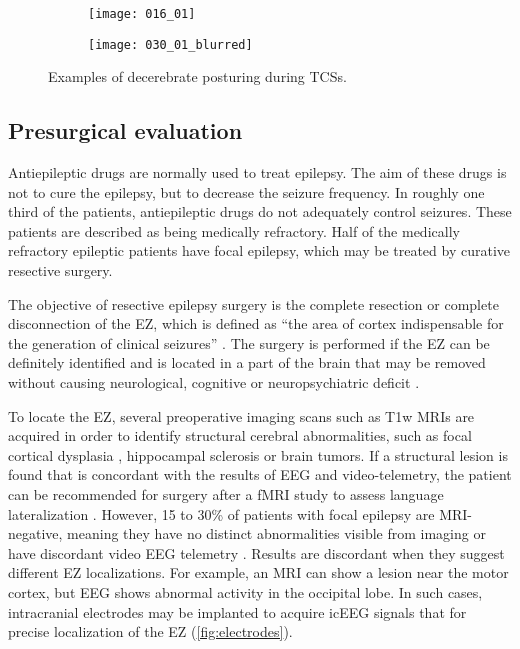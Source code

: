\begin{figure}
  \centering

  \begin{subfigure}{0.49\linewidth}
    \texttt{[image: 016\_01]}
  \end{subfigure}
  \begin{subfigure}{0.49\linewidth}
    \texttt{[image: 030\_01\_blurred]}
  \end{subfigure}
  \caption[Examples of decerebrate posturing]{
    Examples of decerebrate posturing during \acp{TCS}.
  }
  \label{fig:decerebration}
\end{figure}


\subsection{Presurgical evaluation}


Antiepileptic drugs are normally used to treat epilepsy.
The aim of these drugs is not to cure the epilepsy, but to decrease the seizure frequency.
In roughly one third of the patients, antiepileptic drugs do not adequately control seizures.
These patients are described as being medically refractory.
Half of the medically refractory epileptic patients have focal epilepsy, which may be treated by curative resective surgery.

The objective of resective epilepsy surgery is the complete resection or complete disconnection of the \ac{EZ}, which is defined as ``the area of cortex indispensable for the generation of clinical seizures'' \cite{rosenow_presurgical_2001}.
The surgery is performed if the \ac{EZ} can be definitely identified and is located in a part of the brain that may be removed without causing neurological, cognitive or neuropsychiatric deficit \cite{jobst_resective_2015}.

To locate the \ac{EZ}, several preoperative imaging scans such as \ac{T1w} \acp{MRI} are acquired in order to identify structural cerebral abnormalities, such as focal cortical dysplasia \cite{kabat_focal_2012}, hippocampal sclerosis \cite{thom_review_2014} or brain tumors.
If a structural lesion is found that is concordant with the results of \ac{EEG} and video-telemetry, the patient can be recommended for surgery after a \ac{fMRI} study to assess language lateralization \cite{duncan_brain_2016}.
However, 15 to 30\% of patients with focal epilepsy are \ac{MRI}-negative, meaning they have no distinct abnormalities visible from imaging or have discordant video \ac{EEG} telemetry \cite{bien_characteristics_2009}.
Results are discordant when they suggest different \ac{EZ} localizations.
For example, an \ac{MRI} can show a lesion near the motor cortex, but \ac{EEG} shows abnormal activity in the occipital lobe.
In such cases, intracranial electrodes may be implanted to acquire \ac{icEEG} signals that for precise localization of the \ac{EZ} (\cref{fig:electrodes}).


